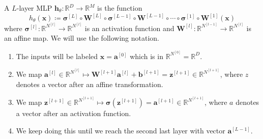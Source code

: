 \documentclass{article}
\begin{document}
    \begin{definition}
      A $L$-layer MLP $\mathbf{h}_\theta : \mathbb{R}^D \longrightarrow \mathbb{R}^M$ is the function 
        \[h_\theta (\mathbf{x}) \coloneqq \boldsymbol{\sigma}^{[L]} \circ \mathbf{W}^{[L]} \circ \boldsymbol{\sigma}^{[L-1]} \circ \mathbf{W}^{[L-1]} \circ \cdots \circ \boldsymbol{\sigma}^{[1]} \circ \mathbf{W}^{[1]} (\mathbf{x})\]
      where $\boldsymbol{\sigma}^{[l]}: \mathbb{R}^{N^{[l]}} \rightarrow \mathbb{R}^{N^{[l]}}$ is an activation function and $\mathbf{W}^{[l]}: \mathbb{R}^{N^{[l-1]}} \rightarrow \mathbb{R}^{N^{[l]}}$ is an affine map. We will use the following notation. 
      \begin{enumerate}
        \item The inputs will be labeled $\mathbf{x} = \mathbf{a}^{[0]}$ which is in $\mathbb{R}^{N^{[0]}} = \mathbb{R}^D$. 
        
        \item We map $\mathbf{a}^{[l]} \in \mathbb{R}^{N^{[l]}} \mapsto \mathbf{W}^{[l+1]} \mathbf{a}^{[l]} + \mathbf{b}^{[l+1]}= \mathbf{z}^{[l+1]} \in \mathbb{R}^{N^{[l+1]}}$, where $z$ denotes a vector after an affine transformation. 

        \item We map $\mathbf{z}^{[l+1]} \in \mathbb{R}^{N^{[l+1]}} \mapsto \boldsymbol{\sigma}(\mathbf{z}^{[l+1]}) = \mathbf{a}^{[l+1]} \in \mathbb{R}^{N^{[l+1]}}$, where $a$ denotes a vector after an activation function. 

        \item We keep doing this until we reach the second last layer with vector $\mathbf{a}^{[L-1]}$. 


\end{enumerate}
\end{definition}
\end{document}
